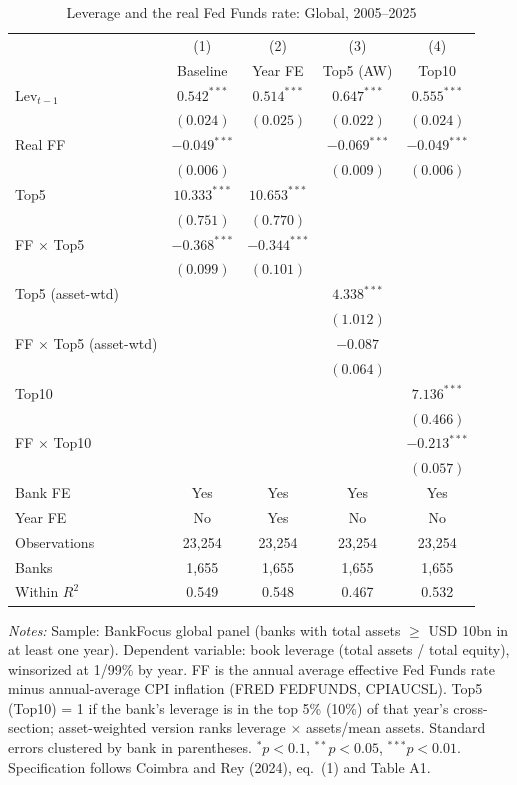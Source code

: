 \begin{table}[htbp]
\centering
\small
\begin{threeparttable}
\caption{Leverage and the real Fed Funds rate: Global, 2005--2025}
\label{tab:cr_eq1_3}
\begin{tabular}{lcccc}
\toprule
 & (1) & (2) & (3) & (4) \\
 & Baseline & Year FE & Top5 (AW) & Top10 \\
\midrule
Lev$_{t-1}$ & $0.542^{***}$ & $0.514^{***}$ & $0.647^{***}$ & $0.555^{***}$ \\
 & $(0.024)$ & $(0.025)$ & $(0.022)$ & $(0.024)$ \\[2pt]
Real FF & $-0.049^{***}$ &  & $-0.069^{***}$ & $-0.049^{***}$ \\
 & $(0.006)$ &  & $(0.009)$ & $(0.006)$ \\[2pt]
Top5 & $10.333^{***}$ & $10.653^{***}$ &  &  \\
 & $(0.751)$ & $(0.770)$ &  &  \\[2pt]
FF $\times$ Top5 & $-0.368^{***}$ & $-0.344^{***}$ &  &  \\
 & $(0.099)$ & $(0.101)$ &  &  \\[2pt]
Top5 (asset-wtd) &  &  & $4.338^{***}$ &  \\
 &  &  & $(1.012)$ &  \\[2pt]
FF $\times$ Top5 (asset-wtd) &  &  & $-0.087$ &  \\
 &  &  & $(0.064)$ &  \\[2pt]
Top10 &  &  &  & $7.136^{***}$ \\
 &  &  &  & $(0.466)$ \\[2pt]
FF $\times$ Top10 &  &  &  & $-0.213^{***}$ \\
 &  &  &  & $(0.057)$ \\
\midrule
Bank FE & Yes & Yes & Yes & Yes \\
Year FE & No & Yes & No & No \\
Observations & 23,254 & 23,254 & 23,254 & 23,254 \\
Banks & 1,655 & 1,655 & 1,655 & 1,655 \\
Within $R^2$ & 0.549 & 0.548 & 0.467 & 0.532 \\
\bottomrule
\end{tabular}
\begin{tablenotes}[flushleft]
\footnotesize
\item \textit{Notes:} Sample: BankFocus global panel (banks with total assets $\geq$ USD 10bn in at least one year). Dependent variable: book leverage (total assets / total equity), winsorized at 1/99\% by year. FF is the annual average effective Fed Funds rate minus annual-average CPI inflation (FRED FEDFUNDS, CPIAUCSL). Top5 (Top10) = 1 if the bank's leverage is in the top 5\% (10\%) of that year's cross-section; asset-weighted version ranks leverage $\times$ assets/mean assets. Standard errors clustered by bank in parentheses. $^{*}p<0.1$, $^{**}p<0.05$, $^{***}p<0.01$. Specification follows Coimbra and Rey (2024), eq.~(1) and Table A1.
\end{tablenotes}
\end{threeparttable}
\end{table}
